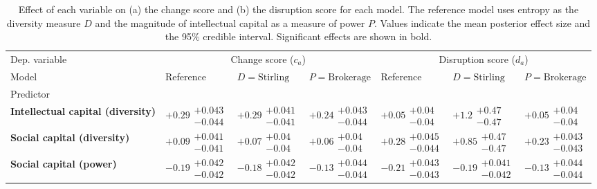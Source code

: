 \begin{table}[H]
\caption{Effect of each variable on (a) the change score and (b) the disruption score for each model. The reference model uses entropy as the diversity measure $D$ and the magnitude of intellectual capital as a measure of power $P$. Values indicate the mean posterior effect size and the 95\% credible interval. Significant effects are shown in bold.}
\label{table:summary_change_disruption}
\renewcommand{\arraystretch}{2}\fontsize{6}{7}\selectfont\begin{tabular}{lllllll}
\toprule
Dep. variable & \multicolumn{3}{c}{Change score ($c_a$)} & \multicolumn{3}{c}{Disruption score ($d_a$)} \\
Model & Reference & $D=\text{Stirling}$ & $P=\text{Brokerage}$ & Reference & $D=\text{Stirling}$ & $P=\text{Brokerage}$ \\
Predictor &  &  &  &  &  &  \\
\midrule
\textbf{Intellectual capital (diversity)} & $\bm{+0.29}\substack{+0.043 \\ -0.044}$ & $\bm{+0.29}\substack{+0.041 \\ -0.041}$ & $\bm{+0.24}\substack{+0.043 \\ -0.044}$ & $\bm{+0.05}\substack{+0.04 \\ -0.04}$ & $\bm{+1.2}\substack{+0.47 \\ -0.47}$ & $\bm{+0.05}\substack{+0.04 \\ -0.04}$ \\
\textbf{Social capital (diversity)} & $\bm{+0.09}\substack{+0.041 \\ -0.041}$ & $\bm{+0.07}\substack{+0.04 \\ -0.04}$ & $\bm{+0.06}\substack{+0.04 \\ -0.04}$ & $\bm{+0.28}\substack{+0.045 \\ -0.044}$ & $\bm{+0.85}\substack{+0.47 \\ -0.47}$ & $\bm{+0.23}\substack{+0.043 \\ -0.043}$ \\
\textbf{Social capital (power)} & $\bm{-0.19}\substack{+0.042 \\ -0.042}$ & $\bm{-0.18}\substack{+0.042 \\ -0.042}$ & $\bm{-0.13}\substack{+0.044 \\ -0.044}$ & $\bm{-0.21}\substack{+0.043 \\ -0.043}$ & $\bm{-0.19}\substack{+0.041 \\ -0.042}$ & $\bm{-0.13}\substack{+0.044 \\ -0.044}$ \\

\end{tabular}
\end{table}
